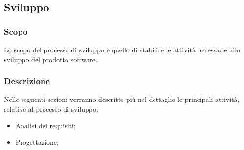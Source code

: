 \subsection{Sviluppo}

\subsubsection{Scopo}
Lo scopo del processo di sviluppo è quello di stabilire le attività necessarie allo sviluppo del prodotto software.

\subsubsection{Descrizione}
Nelle seguenti sezioni verranno descritte più nel dettaglio le principali attività, relative al processo di sviluppo:
\begin{itemize} 
    \item Analisi dei requisiti;
	\item Progettazione;
\end{itemize}




